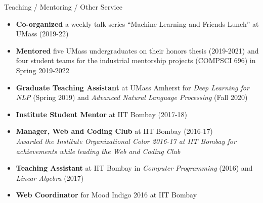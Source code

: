 \documentclass{resume} %
\begin{document}
\begin{rSection}{Teaching / Mentoring / Other Service}
\vspace*{0.1in}
\begin{itemize}[leftmargin=*]
\item \textbf{Co-organized} a weekly talk series ``Machine Learning and Friends Lunch'' at UMass (2019-22)
\item \textbf{Mentored} five UMass undergraduates on their honors thesis (2019-2021) and four student teams for the industrial mentorship projects (COMPSCI 696) in Spring 2019-2022
\item \textbf{Graduate Teaching Assistant} at UMass Amherst for \textit{Deep Learning for NLP} (Spring 2019) and \textit{Advanced Natural Language Processing} (Fall 2020)
\item \textbf{Institute Student Mentor} at IIT Bombay (2017-18)
\item \textbf{Manager, Web and Coding Club} at IIT Bombay (2016-17)\\
\textit{Awarded the Institute Organizational Color 2016-17 at IIT Bombay for achievements while leading the Web and Coding Club}
\item \textbf{Teaching Assistant} at IIT Bombay in \textit{Computer Programming} (2016) and \textit{Linear Algebra} (2017)
\item \textbf{Web Coordinator} for Mood Indigo 2016 at IIT Bombay
\end{itemize}
\end{rSection}

\vspace{0.1in}
\end{document}
